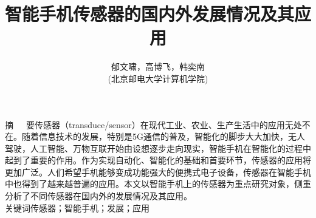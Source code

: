 \documentclass[a4paper,11pt,onecolumn,twoside]{article}
\title{\huge{智能手机传感器的国内外发展情况及其应用}}
\author{郁文啸，高博飞，韩奕南\\[2pt]
\normalsize
(北京邮电大学计算机学院)\\[2pt]}
\date{}
\begin{document}
\newcommand{\ccr}[1]{\makecell{{\color{#1}\rule{1cm}{1cm}}}}

\maketitle

\setlength{\oddsidemargin}{ 1cm}  %
\setlength{\evensidemargin}{\oddsidemargin}
\setlength{\textwidth}{13.50cm}
\vspace{-.8cm}


\begin{center}
\parbox{\textwidth}{
摘~~~要\quad {}传感器（transduce/sensor）在现代工业、农业、生产生活中的应用无处不在。随着信息技术的发展，特别是5G通信的普及，智能化的脚步大大加快，无人驾驶，人工智能、万物互联开始由设想逐步走向现实，智能手机在智能化的过程中起到了重要的作用。作为实现自动化、智能化的基础和首要环节，传感器的应用将更加广泛。人们希望手机能够变成功能强大的便携式电子设备，传感器在智能手机中也得到了越来越普遍的应用。本文以智能手机上的传感器为重点研究对象，侧重分析了不同传感器在国内外的发展情况及其应用。\\
关键词\quad{}传感器；智能手机；发展；应用
}
\end{center}

\setlength{\oddsidemargin}{-.5cm}  %
\setlength{\evensidemargin}{\oddsidemargin}
\setlength{\textwidth}{17.00cm}
\end{document}
